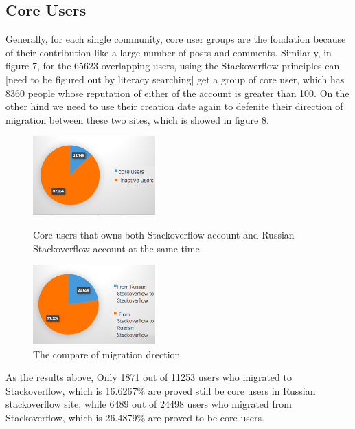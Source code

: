 \documentclass[A4paper,twoside,twocolumn]{article}
\begin{document}
\subsection{Core Users}
Generally, for each single community, core user groups are the foudation because of their contribution like a large number of posts and comments. Similarly, in figure 7, for the 65623 overlapping users, using the Stackoverflow principles can
[need to be figured out by literacy searching] 
get a group of core user, which has 8360 people whose reputation of either of the account is greater than 100. On the other hind we need to use their creation date again to defenite their direction of migration between these two sites, which is showed in figure 8.\begin{figure}[H]
		\includegraphics[width = 0.42\textwidth]{coreuser1.png}
		\caption{Core users that owns both Stackoverflow account and Russian Stackoverflow account at the same time}
		\includegraphics[width = 0.42\textwidth]{coreuser2.png}
		\caption{The compare of migration drection }
  	\end{figure}
As the results above, Only 1871 out of 11253 users who migrated to Stackoverflow, which is 16.6267\% are proved still be core users in Russian stackoverflow site, while 6489 out of 24498 users who migrated from Stackoverflow, which is 26.4879\% are proved to be core users.
\end{document}
